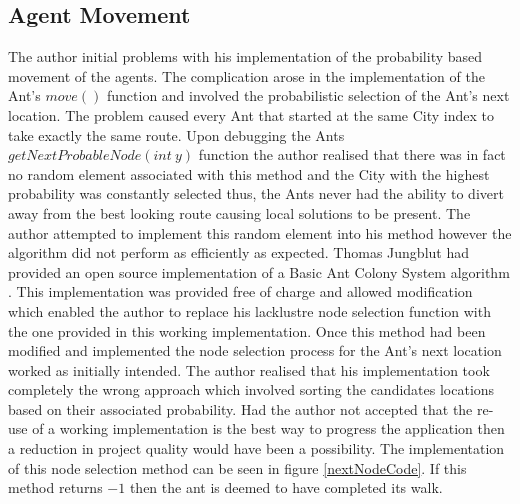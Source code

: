 \subsection{Agent Movement}
\label{antyMove}
The author initial problems with his implementation of the probability based movement of the agents. The complication arose in the implementation of the Ant's $move()$ function and involved the probabilistic selection of the Ant's next location. The problem caused every Ant that started at the same City index to take exactly the same route. Upon debugging the Ants $getNextProbableNode(int\ y)$ function the author realised that there was in fact no random element associated with this method and the City with the highest probability was constantly selected thus, the Ants never had the ability to divert away from the best looking route causing local solutions to be present. The author attempted to implement this random element into his method however the algorithm did not perform as efficiently as expected. Thomas Jungblut had provided an open source implementation of a Basic Ant Colony System algorithm \cite{tjung:aco:blog}. This implementation was provided free of charge and allowed modification which enabled the author to replace his lacklustre node selection function with the one provided in this working implementation. Once this method had been modified and implemented the node selection process for the Ant's next location worked as initially intended. The author realised that his implementation took completely the wrong approach which involved sorting the candidates locations based on their associated probability. Had the author not accepted that the re-use of a working implementation is the best way to progress the application then a reduction in project quality would have been a possibility. The implementation of this node selection method can be seen in figure \ref{nextNodeCode}. If this method returns $-1$ then the ant is deemed to have completed its walk.

